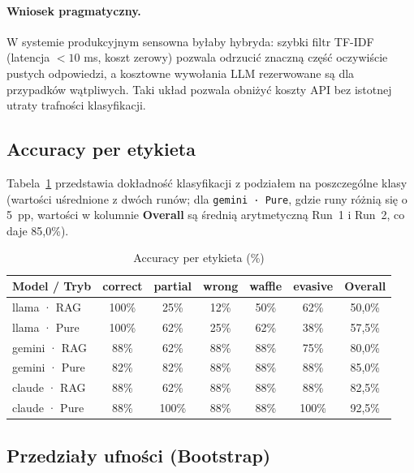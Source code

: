 \documentclass[12pt, a4paper]{article}
\begin{document}
\paragraph{Wniosek pragmatyczny.}
W systemie produkcyjnym sensowna byłaby hybryda: szybki filtr TF-IDF
(latencja $<10$ ms, koszt zerowy) pozwala odrzucić znaczną część
oczywiście pustych odpowiedzi, a kosztowne wywołania LLM rezerwowane
są dla przypadków wątpliwych. Taki układ pozwala obniżyć koszty API
bez istotnej utraty trafności klasyfikacji.

\subsection{Accuracy per etykieta}

Tabela~\ref{tab:per_label} przedstawia dokładność klasyfikacji z podziałem
na poszczególne klasy (wartości uśrednione z dwóch runów; dla \texttt{gemini · Pure},
gdzie runy różnią się o 5~pp, wartości w kolumnie \textbf{Overall} są średnią
arytmetyczną Run~1 i Run~2, co daje 85,0\%).

\begin{table}[H]
    \centering
    \caption{Accuracy per etykieta (\%)}
    \label{tab:per_label}
    \begin{tabular}{@{}lcccccc@{}}
        \toprule
        \textbf{Model / Tryb}
            & \textbf{correct} & \textbf{partial}
            & \textbf{wrong}   & \textbf{waffle}
            & \textbf{evasive} & \textbf{Overall} \\
        \midrule
        llama · RAG        & 100\% & 25\% & 12\%  & 50\%  & 62\%  & 50,0\% \\
        llama · Pure       & 100\% & 62\% & 25\%  & 62\%  & 38\%  & 57,5\% \\
        \midrule
        gemini · RAG       & 88\%  & 62\% & 88\%  & 88\%  & 75\%  & 80,0\% \\
        gemini · Pure      & 82\%  & 82\% & 88\%  & 88\%  & 88\%  & 85,0\% \\
        \midrule
        claude · RAG       & 88\%  & 62\% & 88\%  & 88\%  & 88\%  & 82,5\% \\
        claude · Pure      & 88\%  & 100\%& 88\%  & 88\%  & 100\% & 92,5\% \\
        \bottomrule
    \end{tabular}
\end{table}

\subsection{Przedziały ufności (Bootstrap)}
\end{document}
